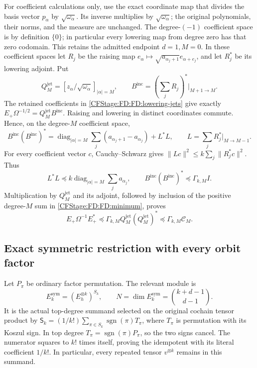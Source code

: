 For coefficient calculations only, use the exact coordinate map that
divides the basis vector \(p_\alpha\) by \(\sqrt{\omega_\alpha}\).
Its inverse multiplies by \(\sqrt{\omega_\alpha}\); the original
polynomials, their norms, and the measure are unchanged.
The degree-\((-1)\) coefficient space is by definition \(\{0\}\);
in particular every lowering map from degree zero has that zero
codomain.  This retains the admitted endpoint \(d=1,M=0\).
In these coefficient spaces let \(R_j\) be the raising map
\(e_\alpha\mapsto\sqrt{a_{\alpha_j+1}}e_{\alpha+e_j}\), and let
\(R_j^*\) be its lowering adjoint.  Put
\[
Q_M^{\mathrm{jet}}=[z_\alpha/\sqrt{\omega_\alpha}]_{|\alpha|=M},
\qquad B^{\mathrm{inc}}=(\textstyle\sum_jR_j)^*\big|_{M+1\to M}.
\]
The retained coefficients in \eqref{CFStage:FD:FD:lowering-jets} give exactly
\(E_+\Omega^{-1/2}=Q_M^{\mathrm{jet}}B^{\mathrm{inc}}\).
Raising and lowering in distinct coordinates commute.  Hence, on the
degree-\(M\) coefficient space,
\[
B^{\mathrm{inc}}(B^{\mathrm{inc}})^*
=\operatorname{diag}_{|\alpha|=M}\sum_j
(a_{\alpha_j+1}-a_{\alpha_j})+L^*L,
\qquad L=\textstyle\sum_j R_j^*\big|_{M\to M-1}.
\]
For every coefficient vector \(c\), Cauchy--Schwarz gives
\(\|Lc\|^2\le k\sum_j\|R_j^*c\|^2\).  Thus
\[
L^*L\preceq k\operatorname{diag}_{|\alpha|=M}\sum_ja_{\alpha_j},
\qquad
B^{\mathrm{inc}}(B^{\mathrm{inc}})^*\preceq\Gamma_{k,M}I.
\]
Multiplication by \(Q_M^{\mathrm{jet}}\) and its adjoint, followed by
inclusion of the positive degree-\(M\) sum in \eqref{CFStage:FD:FD:minimum}, proves
\begin{equation}
E_+\Omega^{-1}E_+^*\preceq
\Gamma_{k,M}Q_M^{\mathrm{jet}}(Q_M^{\mathrm{jet}})^*
\preceq\Gamma_{k,M}\mathcal C_M.
\tag{FD.21}\label{CFStage:FD:FD:lowering-bound}
\end{equation}

\subsection{Exact symmetric restriction with every orbit factor}

Let \(P_\pi\) be ordinary factor permutation.  The relevant module is
\[
E_k^{\mathrm{sym}}=(E_h^{\otimes k})^{S_k},\qquad
N=\dim E_k^{\mathrm{sym}}=\binom{k+d-1}{d-1}.
\]
It is the actual top-degree summand selected on the original cochain
tensor product by
\(\mathsf S_k=(1/k!)\sum_{\pi\in S_k}\operatorname{sgn}(\pi)T_\pi\),
where \(T_\pi\) is permutation with its Koszul sign.
In top degree \(T_\pi=\operatorname{sgn}(\pi)P_\pi\), so the two signs
cancel.  The numerator squares to \(k!\) times itself, proving the
idempotent with its literal coefficient \(1/k!\).  In particular,
every repeated tensor \(v^{\otimes k}\) remains in this summand.


